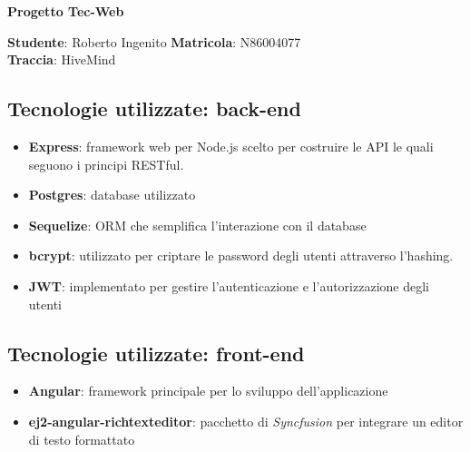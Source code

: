 \documentclass[12pt]{report}
\begin{document}
{\centering \LARGE \bfseries Progetto Tec-Web \\}
\bigskip\bigskip \noindent
\begin{center}\large
	\textbf{\sffamily Studente}: Roberto Ingenito \qquad \textbf{\sffamily Matricola}: N86004077\bigskip\\
	\textbf{\sffamily Traccia}: HiveMind
\end{center}

\subsection*{Tecnologie utilizzate: back-end}
\begin{itemize}
	\item \textbf{\sffamily Express}: framework web per Node.js scelto per costruire le API le quali seguono i principi RESTful.
	\item \textbf{\sffamily Postgres}: database utilizzato
	\item \textbf{\sffamily Sequelize}: ORM che semplifica l'interazione con il database
	\item \textbf{\sffamily bcrypt}: utilizzato per criptare le password degli utenti attraverso l'hashing.
	\item \textbf{\sffamily JWT}: implementato per gestire l'autenticazione e l'autorizzazione degli utenti
\end{itemize}

\subsection*{Tecnologie utilizzate: front-end}
\begin{itemize}
	\item \textbf{\sffamily Angular}: framework principale per lo sviluppo dell'applicazione
	\item \textbf{\sffamily ej2-angular-richtexteditor}: pacchetto di \textit{Syncfusion} per integrare un editor di testo formattato
\end{itemize}
\end{document}
